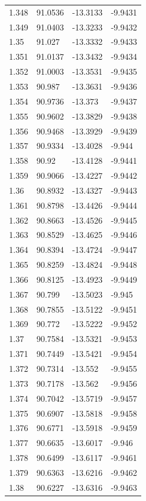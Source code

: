 \begin{tabular}{llll}
1.348 & 91.0536 & -13.3133 & -9.9431 \\
1.349 & 91.0403 & -13.3233 & -9.9432 \\
1.35 & 91.027 & -13.3332 & -9.9433 \\
1.351 & 91.0137 & -13.3432 & -9.9434 \\
1.352 & 91.0003 & -13.3531 & -9.9435 \\
1.353 & 90.987 & -13.3631 & -9.9436 \\
1.354 & 90.9736 & -13.373 & -9.9437 \\
1.355 & 90.9602 & -13.3829 & -9.9438 \\
1.356 & 90.9468 & -13.3929 & -9.9439 \\
1.357 & 90.9334 & -13.4028 & -9.944 \\
1.358 & 90.92 & -13.4128 & -9.9441 \\
1.359 & 90.9066 & -13.4227 & -9.9442 \\
1.36 & 90.8932 & -13.4327 & -9.9443 \\
1.361 & 90.8798 & -13.4426 & -9.9444 \\
1.362 & 90.8663 & -13.4526 & -9.9445 \\
1.363 & 90.8529 & -13.4625 & -9.9446 \\
1.364 & 90.8394 & -13.4724 & -9.9447 \\
1.365 & 90.8259 & -13.4824 & -9.9448 \\
1.366 & 90.8125 & -13.4923 & -9.9449 \\
1.367 & 90.799 & -13.5023 & -9.945 \\
1.368 & 90.7855 & -13.5122 & -9.9451 \\
1.369 & 90.772 & -13.5222 & -9.9452 \\
1.37 & 90.7584 & -13.5321 & -9.9453 \\
1.371 & 90.7449 & -13.5421 & -9.9454 \\
1.372 & 90.7314 & -13.552 & -9.9455 \\
1.373 & 90.7178 & -13.562 & -9.9456 \\
1.374 & 90.7042 & -13.5719 & -9.9457 \\
1.375 & 90.6907 & -13.5818 & -9.9458 \\
1.376 & 90.6771 & -13.5918 & -9.9459 \\
1.377 & 90.6635 & -13.6017 & -9.946 \\
1.378 & 90.6499 & -13.6117 & -9.9461 \\
1.379 & 90.6363 & -13.6216 & -9.9462 \\
1.38 & 90.6227 & -13.6316 & -9.9463 \\

\end{tabular}
